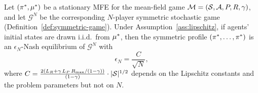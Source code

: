 \documentclass[11pt,a4paper]{article}
\begin{document}
\begin{theorem}
\label{thm:n-player-approx}
Let $(\pi^*, \mu^*)$ be a stationary MFE for the
mean-field game $\mathcal{M} = (\mathcal{S}, \mathcal{A}, P, R,
\gamma)$, and let $\mathcal{G}^N$ be the corresponding
$N$-player symmetric stochastic game
(Definition~\ref{def:symmetric-game}).  Under
Assumption~\ref{ass:lipschitz}, if agents' initial states are
drawn i.i.d.\ from $\mu^*$, then the symmetric profile
$(\pi^*, \ldots, \pi^*)$ is an $\epsilon_N$-Nash
equilibrium of $\mathcal{G}^N$ with
\[
  \epsilon_N = \frac{C}{\sqrt{N}},
\]
where $C = \frac{2(L_R + \gamma\, L_P\, R_{\max} /
(1-\gamma))}{(1-\gamma)} \cdot
|\mathcal{S}|^{1/2}$ depends on the Lipschitz constants and the
problem parameters but not on $N$.
\end{theorem}
\end{document}
